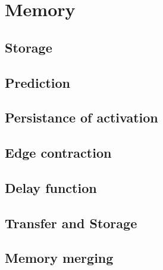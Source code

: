 \chapter{Memory}
\section{Storage}
\section{Prediction}



	
\section{Persistance of activation}
\section{Edge contraction}
\section{Delay function}
\section{Transfer and Storage}
\section{Memory merging}
